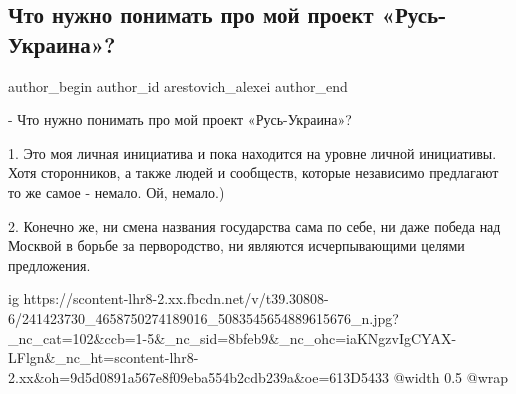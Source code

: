  
 
 
 
 
 
\subsection{Что нужно понимать про мой проект «Русь-Украина»?}
\label{sec:05_09_2021.fb.arestovich_alexei.1.rusj_ukraina_proekt}
 
\ifcmt
 author_begin
   author_id arestovich_alexei
 author_end
\fi

- Что нужно понимать про мой проект «Русь-Украина»?

1. Это моя личная инициатива и пока находится на уровне личной инициативы.
Хотя сторонников, а также людей и сообществ, которые независимо предлагают то же самое - немало. Ой, немало.)

2. Конечно же, ни смена названия государства сама по себе, ни даже победа над
Москвой в борьбе за первородство, ни являются исчерпывающими целями
предложения.

\ifcmt
  ig https://scontent-lhr8-2.xx.fbcdn.net/v/t39.30808-6/241423730_4658750274189016_5083545654889615676_n.jpg?_nc_cat=102&ccb=1-5&_nc_sid=8bfeb9&_nc_ohc=iaKNgzvIgCYAX-LFlgn&_nc_ht=scontent-lhr8-2.xx&oh=9d5d0891a567e8f09eba554b2cdb239a&oe=613D5433
  @width 0.5
  @wrap \parpic[r]
\fi


